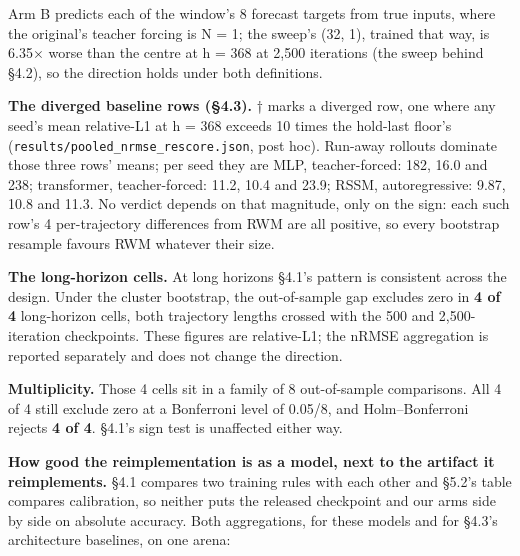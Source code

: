 \documentclass[10pt]{article}
\begin{document}
Arm B predicts each of the window's 8 forecast targets from true inputs, where the original's teacher forcing is N = 1; the sweep's (32, 1), trained that way, is 6.35$\times$ worse than the centre at h = 368 at 2,500 iterations (the sweep behind \S{}4.2), so the direction holds under both definitions.

\textbf{The diverged baseline rows (\S{}4.3).} † marks a diverged row, one where any seed's mean relative-L1 at h = 368 exceeds 10 times the hold-last floor's (\texttt{results/\allowbreak{}pooled\_\allowbreak{}nrmse\_\allowbreak{}rescore\allowbreak{}.json}, post hoc). Run-away rollouts dominate those three rows' means; per seed they are MLP, teacher-forced: 182, 16.0 and 238; transformer, teacher-forced: 11.2, 10.4 and 23.9; RSSM, autoregressive: 9.87, 10.8 and 11.3. No verdict depends on that magnitude, only on the sign: each such row's 4 per-trajectory differences from RWM are all positive, so every bootstrap resample favours RWM whatever their size.

\textbf{The long-horizon cells.} At long horizons \S{}4.1's pattern is consistent across the design. Under the cluster bootstrap, the out-of-sample gap excludes zero in \textbf{4 of 4} long-horizon cells, both trajectory lengths crossed with the 500 and 2,500-iteration checkpoints. These figures are relative-L1; the nRMSE aggregation is reported separately and does not change the direction.

\textbf{Multiplicity.} Those 4 cells sit in a family of 8 out-of-sample comparisons. All 4 of 4 still exclude zero at a Bonferroni level of 0.05/8, and Holm--Bonferroni rejects \textbf{4 of 4}. \S{}4.1's sign test is unaffected either way.

\textbf{How good the reimplementation is as a model, next to the artifact it reimplements.} \S{}4.1 compares two training rules with each other and \S{}5.2's table compares calibration, so neither puts the released checkpoint and our arms side by side on absolute accuracy. Both aggregations, for these models and for \S{}4.3's architecture baselines, on one arena:
\end{document}
